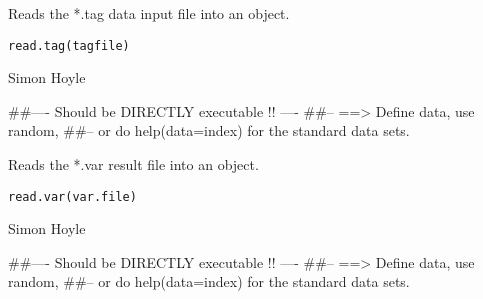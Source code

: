 \documentclass[a4paper]{book}
\begin{document}
%
\begin{Description}\relax

Reads the *.tag data input file into an object. 
\end{Description}
%
\begin{Usage}
\begin{verbatim}
read.tag(tagfile)
\end{verbatim}
\end{Usage}
%
\begin{Arguments}
\begin{ldescription}
\item[\code{tagfile}] 


\end{ldescription}
\end{Arguments}
%
\begin{Author}\relax

Simon Hoyle
\end{Author}
%
\begin{Examples}
\begin{ExampleCode}
##---- Should be DIRECTLY executable !! ----
##-- ==>  Define data, use random,
##--	or do  help(data=index)  for the standard data sets.

\end{ExampleCode}
\end{Examples}
%
\begin{Description}\relax

Reads the *.var result file into an object. 
\end{Description}
%
\begin{Usage}
\begin{verbatim}
read.var(var.file)
\end{verbatim}
\end{Usage}
%
\begin{Arguments}
\begin{ldescription}
\item[\code{var.file}] 


\end{ldescription}
\end{Arguments}
%
\begin{Author}\relax

Simon Hoyle
\end{Author}
%
\begin{Examples}
\begin{ExampleCode}
##---- Should be DIRECTLY executable !! ----
##-- ==>  Define data, use random,
##--	or do  help(data=index)  for the standard data sets.

\end{ExampleCode}
\end{Examples}
\end{document}
